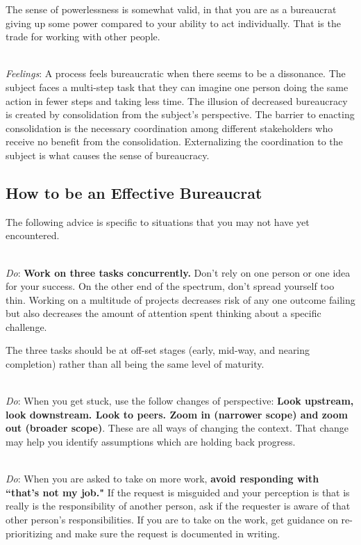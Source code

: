 The sense of powerlessness is somewhat valid, in that you are as a bureaucrat giving up some power compared to your ability to act individually. That is the trade for working with other people.

\ \\
\textit{Feelings}: A process feels bureaucratic when there seems to be a dissonance. The subject faces a multi-step task that they can imagine one person doing the same action in fewer steps and taking less time. The illusion of decreased bureaucracy is created by consolidation from the subject's perspective. The barrier to enacting consolidation is the necessary coordination among different stakeholders who receive no benefit from the consolidation. Externalizing the coordination to the subject is what causes the sense of bureaucracy. 

\subsection*{How to be an Effective Bureaucrat}

The following advice is specific to situations that you may not have yet encountered. 

\ \\
\textit{Do}: \textbf{Work on three tasks concurrently.} Don't rely on one person or one idea for your success. On the other end of the spectrum, don't spread yourself too thin.
Working on a multitude of projects decreases risk of any one outcome failing but also decreases the amount of attention spent thinking about a specific challenge. 

The three tasks should be at off-set stages (early, mid-way, and nearing completion) rather than all being the same level of maturity.

\ \\
\textit{Do}: When you get stuck, use the follow changes of perspective:  
\textbf{Look upstream, look downstream. Look to peers. Zoom in (narrower scope) and zoom out (broader scope)}. These are all ways of changing the context. That change may help you identify assumptions which are holding back progress.

\ \\
\textit{Do}: When you are asked to take on more work, \textbf{avoid responding with ``that's not my job."} If the request is misguided and your perception is that is really is the responsibility of another person, ask if the requester is aware of that other person's responsibilities. If you are to  take on the work, get guidance on re-prioritizing and make sure the request is documented in writing. 

